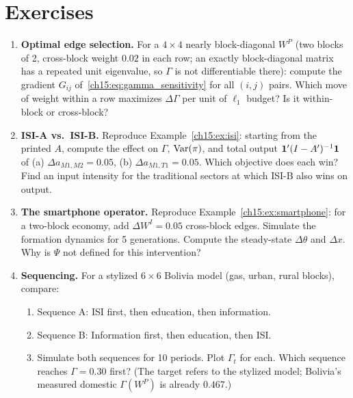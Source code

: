 \documentclass[../structural_economics_book.tex]{subfiles}
\begin{document}
\section{Exercises}
\label{ch15:sec:exercises}

\begin{enumerate}[label=\textbf{15.\arabic*}, leftmargin=3em]

\item \textbf{Optimal edge selection.} For a $4 \times 4$ nearly block-diagonal $W^P$ (two blocks of 2, cross-block weight $0.02$ in each row; an exactly block-diagonal matrix has a repeated unit eigenvalue, so $\Gamma$ is not differentiable there): compute the gradient $G_{ij}$ of~\eqref{ch15:eq:gamma_sensitivity} for all $(i,j)$ pairs. Which move of weight within a row maximizes $\Delta\Gamma$ per unit of $\ell_1$ budget? Is it within-block or cross-block?

\item \textbf{ISI-A vs.\ ISI-B.} Reproduce Example~\ref{ch15:ex:isi}: starting from the printed $A$, compute the effect on $\Gamma$, $\operatorname{Var}(\pi)$, and total output $\mathbf{1}'(I - A')^{-1}\mathbf{1}$ of (a) $\Delta a_{M1,M2} = 0.05$, (b) $\Delta a_{M1,T1} = 0.05$. Which objective does each win? Find an input intensity for the traditional sectors at which ISI-B also wins on output.

\item \textbf{The smartphone operator.} Reproduce Example~\ref{ch15:ex:smartphone}: for a two-block economy, add $\Delta W^I = 0.05$ cross-block edges. Simulate the formation dynamics for 5 generations. Compute the steady-state $\Delta\theta$ and $\Delta x$. Why is $\Psi$ not defined for this intervention?

\item \textbf{Sequencing.} For a stylized $6 \times 6$ Bolivia model (gas, urban, rural blocks), compare:
\begin{enumerate}
\item Sequence A: ISI first, then education, then information.
\item Sequence B: Information first, then education, then ISI.
\item Simulate both sequences for 10 periods. Plot $\Gamma_t$ for each. Which sequence reaches $\Gamma = 0.30$ first? (The target refers to the stylized model; Bolivia's measured domestic $\Gamma(W^P)$ is already $0.467$.)
\end{enumerate}


\end{enumerate}
\end{document}
